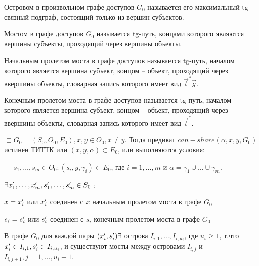 \begin{defs}[Остров]
	Островом в произвольном графе доступов $G_0$ называется его максимальный tg-связный подграф, состоящий только из вершин субъектов.
\end{defs}

\begin{defs}[Мост]
	Мостом в графе доступов $G_0$ называется tg-путь, концами которого являются вершины субъекты, проходящий через вершины объекты.
\end{defs}

\begin{defs}
	Начальным пролетом моста в графе доступов называется tg-путь, началом которого является вершина субъект, концом -- объект, проходящий через ввершины объекты, словарная запись которого имеет вид
	 $ \overrightarrow{t}^* \overrightarrow{g} $.
\end{defs}

\begin{defs}
	Конечным пролетом моста в графе доступов называется tg-путь, началом которого является вершина субъект, концом -- объект, проходящий через ввершины объекты, словарная запись которого имеет вид
	$\overrightarrow{t}^*$.
\end{defs}

\begin{proofs}
	$\sqsupset  G_0 = (S_0, O_0, E_0), x,y \in O_0, x \neq y$. Тогда предикат $can-share(\alpha, x, y, G_0)$
	истинен ТИТТК или $(x, y, \alpha ) \subset E_0$, или выполняются условия:
	\begin{enumerate*}
		\item $ \sqsupset s_1, \ldots, s_m \in O_0 : (s_i, y, \gamma_i) \subset E_0 $, где
		$ i = 1, \ldots, m $ и $ \alpha = \gamma_1 \cup \ldots \cup \gamma_m $.
		\item $ \exists x_1^{\prime}, \ldots, x_m^{\prime}, s_1^{\prime}, \ldots, s_m^{\prime} \in S_0$ :
			\begin{itemize*}
				\item $x = x_i^{\prime}$ или $x_i^{\prime}$ соединен с $x$ начальным пролетом моста в графе $G_0$
				\item $s_i = s_i^{\prime}$ или $s_i^{\prime}$ соединен с $s_i$ конечным пролетом моста в графе $G_0$
			\end{itemize*}
		\item В графе $G_0$ для каждой пары $(x_i^{\prime}, s_i^{\prime}) \exists $ острова $I_{i,1}, \ldots, I_{i, u_{i}}$, где $u_i \geqslant 1$, т.что
		$x_i^{\prime} \in I_{i,1}, s_i^{\prime} \in I_{i, u_{i}}$, и существуют мосты между островами $I_{i,j}$ и $I_{i, j+1}, j = 1, \ldots, u_i - 1$.
	\end{enumerate*}
\end{proofs}

